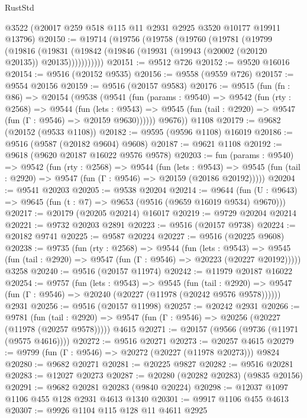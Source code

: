\begin{lexlean}{RustStd}
\begin{coremodule}
    @3522
    (@20017 @259 @518 @115 @11 @2931 @2925 @3520 @10177 @19911 @13796)
@20150 := @19714
    (@19756
      (@19758
        (@19760
          (@19781
            (@19799
              (@19816
                (@19831 (@19842 (@19846 (@19931 (@19943 (@20002 (@20120 @20135)) @20135)))))))))))
@20151 := @9512 @726
@20152 := @9520 @16016
@20154 := @9516 (@20152 @9535)
@20156 := @9558 (@9559 @726)
@20157 := @9554 @20156
@20159 := @9516 (@20157 @9583)
@20176 := @9515
    (fun (fn : @86) =>
    @20154
      (@9538
        (@9541
          (fun (params : @9540) =>
          @9542
            (fun (rty : @2568) =>
            @9544
              (fun (lets : @9543) =>
              @9545 (fun (tail : @2920) => @9547 (fun (Γ : @9546) => @20159 @9630))))))
        @9676))
    @1108
@20179 := @9682 (@20152 (@9533 @1108))
@20182 := @9595 (@9596 @1108) @16019
@20186 := @9516 (@9587 (@20182 @9604) @9608)
@20187 := @9621 @1108
@20192 := @9618 (@9620 @20187 @16022 @9576 @9578)
@20203 := fun (params : @9540) =>
  @9542
    (fun (rty : @2568) =>
    @9544
      (fun (lets : @9543) =>
      @9545 (fun (tail : @2920) => @9547 (fun (Γ : @9546) => @20159 (@20186 @20192)))))
@20204 := @9541 @20203
@20205 := @9538 @20204
@20214 := @9644
    (fun (U : @9643) => @9645 (fun (t : @7) => @9653 (@9516 (@9659 @16019 @9534) @9670)))
@20217 := @20179 (@20205 @20214) @16017
@20219 := @9729 @20204 @20214
@20221 := @9732 @20203 @2891
@20223 := @9516 (@20157 @9738)
@20224 := @20182 @9741
@20225 := @9587 @20224
@20227 := @9516 (@20225 @9608)
@20238 := @9735
    (fun (rty : @2568) =>
    @9544
      (fun (lets : @9543) =>
      @9545 (fun (tail : @2920) => @9547 (fun (Γ : @9546) => @20223 (@20227 @20192)))))
    @3258
@20240 := @9516 (@20157 @11974)
@20242 := @11979 @20187 @16022
@20254 := @9757
    (fun (lets : @9543) =>
    @9545
      (fun (tail : @2920) =>
      @9547 (fun (Γ : @9546) => @20240 (@20227 (@11978 (@20242 @9576 @9578))))))
    @2931
@20256 := @9516 (@20157 @11998)
@20257 := @20242 @2931
@20266 := @9781
    (fun (tail : @2920) => @9547 (fun (Γ : @9546) => @20256 (@20227 (@11978 (@20257 @9578)))))
    @4615
@20271 := @20157 (@9566 (@9736 (@11971 (@9575 @4616))))
@20272 := @9516 @20271
@20273 := @20257 @4615
@20279 := @9799 (fun (Γ : @9546) => @20272 (@20227 (@11978 @20273))) @9824
@20280 := @9682 @20271
@20281 := @20225 @9827
@20282 := @9516 @20281
@20283 := @12027 @20273
@20287 := @20280 (@20282 @20283) (@9835 @20156)
@20291 := @9682 @20281 @20283 (@9840 @20224)
@20298 := @12037 @1097 @1106 @455 @128 @2931 @4613 @1340
@20301 := @9917 @1106 @455 @4613
@20307 := @9926 @1104 @115 @128 @11 @4611 @2925

\end{coremodule}
\end{lexlean}
